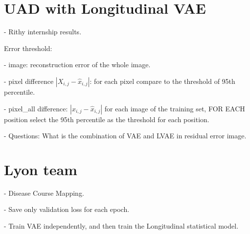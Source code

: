 \section{UAD with Longitudinal VAE}

- Rithy internship results. 

Error threshold:

- image: reconstruction error of the whole image.

- pixel difference $| X_{i,j} - \hat{x}_{i, j} |$: for each pixel compare to the threshold of 95th percentile. 

- pixel\_all difference: $| x_{i, j} - \hat{x}_{i, j} |$ for each image of the training set, FOR EACH position select the 95th percentile as the threshold for each position. 

- Questions: What is the combination of VAE and LVAE in residual error image. 

\section{Lyon team}

- Disease Course Mapping. 

- Save only validation loss for each epoch. 

- Train VAE independently, and then train the Longitudinal statistical model. 


